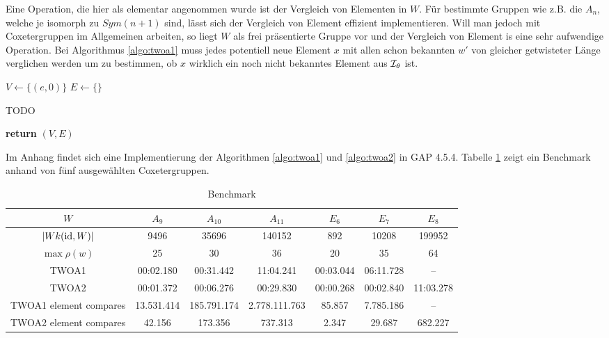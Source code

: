 Eine Operation, die hier als elementar angenommen wurde ist der Vergleich von
Elementen in $W$. Für bestimmte Gruppen wie z.B. die $A_n$, welche je isomorph
zu $Sym(n+1)$ sind, lässt sich der Vergleich von Element effizient
implementieren. Will man jedoch mit Coxetergruppen im Allgemeinen arbeiten, so
liegt $W$ als frei präsentierte Gruppe vor und der Vergleich von Element is eine
sehr aufwendige Operation. Bei Algorithmus \ref{algo:twoa1} muss jedes
potentiell neue Element $x$ mit allen schon bekannten $w'$ von gleicher
getwisteter Länge verglichen werden um zu bestimmen, ob $x$ wirklich ein noch
nicht bekanntes Element aus $\mathcal{I}_{\theta}$ ist.

\begin{algo}[Algorithmus 2]
\hfill
\label{algo:twoa2}
\begin{algorithmic}[1]
 
\State $V \gets \{(e,0)\}$
\State $E \gets \{\}$

	\State TODO
\EndFor

\State \textbf{return} $(V,E)$
\EndProcedure
\end{algorithmic}
\end{algo}

Im Anhang findet sich eine Implementierung der Algorithmen \ref{algo:twoa1} und
\ref{algo:twoa2} in GAP 4.5.4. Tabelle \ref{tab:benchmark-twoa} zeigt ein
Benchmark anhand von fünf ausgewählten Coxetergruppen.

\begin{table}[h]
\label{tab:benchmark-twoa}
\centering
\begin{tabular}{|c|c|c|c|c|c|c|}
\hline
$W$ & $A_9$ & $A_{10}$ & $A_{11}$ & $E_6$ & $E_7$ & $E_8$
\\
\hline
$|Wk(\operatorname{id},W)|$ & 9496 & 35696 & 140152 & 892 & 10208 & 199952 \\
\hline
$\max \rho(w)$ & 25 & 30 & 36 & 20 & 35 & 64 \\
\hline
TWOA1 & 00:02.180 & 00:31.442 & 11:04.241 & 00:03.044 & 06:11.728 & -- \\
\hline
TWOA2 & 00:01.372 & 00:06.276 & 00:29.830 & 00:00.268 & 00:02.840 & 11:03.278 \\
\hline
TWOA1 element compares & 13.531.414 & 185.791.174 & 2.778.111.763 & 85.857 &
7.785.186 & --
\\
\hline
TWOA2 element compares & 42.156 & 173.356 & 737.313 & 2.347 & 29.687 & 682.227 \\
\hline
\end{tabular}
\caption{Benchmark}
\end{table}

